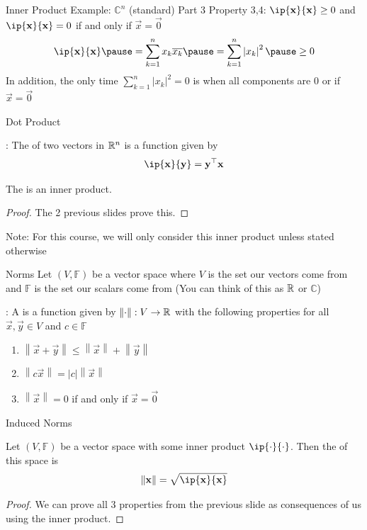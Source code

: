 \documentclass[xcoler=dvipsnames, aspectratio=169]{beamer}
\newcommand{\C}{\mathbb{C}}
\newcommand{\F}{\mathbb{F}}
\newcommand{\abs}[1]{\left|#1\right|}
\renewcommand{\norm}[1]{\left\|#1\right\|}
\begin{document}
    \begin{frame}{Inner Product Example: $\C^n$ (standard) Part 3}
        Property 3,4: $\ip{\vec{x}}{\vec{x}}\geq 0$ and $\ip{\vec{x}}{\vec{x}} = 0$ if and only if
        $\vec{x} = \vec{0}$
        \[
            \ip{\vec{x}}{\vec{x}}\pause = \sum_{k=1}^n x_k\overline{x_k}
            \pause = \sum_{k=1}^n \abs{x_k}^2\pause \geq 0
        \]\pause
        In addition, the only time $\sum_{k=1}^n \abs{x_k}^2=0$ is when all components are 0 or 
        if $\vec{x}=\vec{0}$
    \end{frame}
    \begin{frame}{Dot Product}
        \begin{defn}
            : The  of two vectors in $\mathbb{R}^n$ is a function given by
            \[
                \ip{\vec{x}}{\vec{y}} = \vec{y}^\top\vec{x}
            \]
        \end{defn}\pause
        \begin{theorem}
            The  is an inner product.
        \end{theorem}\pause
        \begin{proof}
            The 2 previous slides prove this.
        \end{proof}\pause
        Note: For this course, we will only consider this inner product unless stated otherwise
    \end{frame}
    \begin{frame}{Norms}
        Let $(V,\F)$ be a vector space where $V$ is the set our vectors come from and $\F$ is the 
        set our scalars come from (You can think of this as $\mathbb{R}$ or $\C$)\pause
        \begin{defn}
            : A  is a function given by $\norm{\cdot}:V\rightarrow\R$
            with the following properties for all $\vec{x},\vec{y}\in V$ and $c\in\F$
            \begin{enumerate}
                \pause\item $\norm{\vec{x} + \vec{y}}\leq \norm{\vec{x}} + \norm{\vec{y}}$
                \pause\item $\norm{c\vec{x}} = \abs{c}\norm{\vec{x}}$
                \pause\item $\norm{\vec{x}} = 0$ if and only if $\vec{x} = \vec{0}$
            \end{enumerate}
        \end{defn}
    \end{frame}
    \begin{frame}{Induced Norms}
        \begin{theorem}
            Let $(V,\F)$ be a vector space with some inner product $\ip{\cdot}{\cdot}$. Then the
             of this space is
            \[
                \norm{\vec{x}} = \sqrt{\ip{\vec{x}}{\vec{x}}}
            \]
        \end{theorem}\pause
        \begin{proof}
            We can prove all 3 properties from the previous slide as consequences of us using the
            inner product.
        \end{proof}
    \end{frame}
\end{document}
